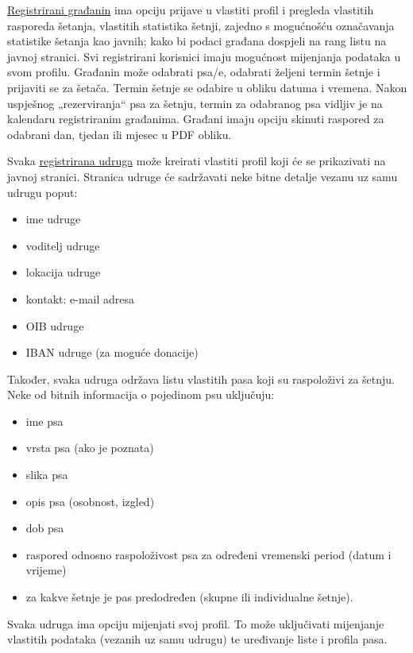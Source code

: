 	  	\underline{Registrirani građanin} ima opciju prijave u vlastiti profil i pregleda vlastitih rasporeda šetanja,
	  vlastitih statistika šetnji, zajedno s mogućnošću označavanja statistike šetanja kao javnih;
	  kako bi podaci građana dospjeli na rang listu na javnoj stranici.
	  Svi registrirani korisnici imaju mogućnost mijenjanja podataka u svom profilu.
	   Građanin može odabrati psa/e, odabrati željeni
	  termin šetnje i prijaviti se za šetača. Termin šetnje se odabire u obliku datuma i vremena.
	  Nakon uspješnog „rezerviranja“ psa za šetnju, termin za odabranog psa vidljiv je na
	  kalendaru registriranim građanima. Građani imaju opciju skinuti 
	  raspored za odabrani dan, tjedan ili mjesec u PDF obliku.\par
	  \vspace{15pt}
	
	Svaka \underline{registrirana udruga} može kreirati vlastiti profil koji će se prikazivati na javnoj
	stranici. Stranica udruge će sadržavati neke bitne detalje vezanu uz samu udrugu poput: 
	\begin{itemize}
		\item ime udruge
		\item voditelj udruge
		\item lokacija udruge
		\item kontakt: e-mail adresa
		\item OIB udruge
		\item IBAN udruge (za moguće donacije)
	\end{itemize}
Također, svaka udruga održava listu vlastitih pasa koji su raspoloživi za šetnju. Neke od bitnih informacija o pojedinom psu uključuju: 
	\begin{itemize}
		\item ime psa
		\item vrsta psa (ako je poznata)
		\item slika psa 
		\item opis psa (osobnost, izgled)
		\item dob psa
		\item raspored odnosno raspoloživost psa za određeni vremenski period (datum i vrijeme) 
		\item za kakve šetnje je pas predodređen (skupne ili individualne šetnje). 
	\end{itemize}
Svaka udruga ima opciju mijenjati svoj profil. To može uključivati mijenjanje vlastitih podataka (vezanih uz samu udrugu) te uređivanje liste i profila pasa. 




